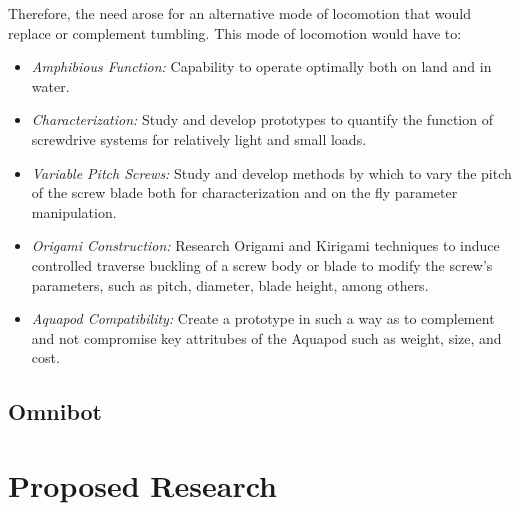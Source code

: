 Therefore, the need arose for an alternative mode of locomotion that would replace or complement tumbling. This mode of locomotion would have to:

\begin{itemize}
	\item \emph{Amphibious Function:} Capability to operate optimally both on land and in water. 
	\item \emph{Characterization:} Study and develop prototypes to quantify the function of screwdrive systems for relatively light and small loads. 
	\item \emph{Variable Pitch Screws:} Study and develop methods by which to vary the pitch of the screw blade both for characterization and on the fly parameter manipulation.
	\item \emph{Origami Construction:} Research Origami and Kirigami techniques to induce controlled traverse buckling of a screw body or blade to modify the screw's parameters, such as pitch, diameter, blade height, among others. 
	\item \emph{Aquapod Compatibility:} Create a prototype in such a way as to complement and not compromise key attritubes of the Aquapod such as weight, size, and cost. 
\end{itemize}
	

\subsection{Omnibot}


\section{Proposed Research} 



